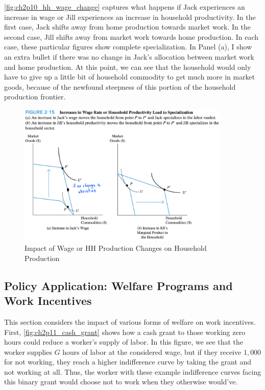 \FloatBarrier

\autoref{fig:ch2p10_hh_wage_change}
captures what happens if Jack experiences an increase 
in wage or Jill experiences an increase in
household productivity.
In the first case, Jack shifts away from home 
production towards market work.
In the second case, Jill shifts away from market work
towards home production. In each case, these particular figures 
show complete specialization. In Panel (a), I show
an extra bullet if there was no change in Jack's 
allocation between market work and home production.
At this point, we can see that the household would only have to 
give up a little bit of household commodity
to get much more in market goods, because of the 
newfound steepness of this portion of the household production frontier.

\begin{figure}[!htb]
    \centering
        \includegraphics[width=0.9\textwidth]{../input/ch_2p10_hh_wage_change.png}
    \caption{Impact of Wage or HH Production Changes on Household Production}
    \label{fig:ch2p10_hh_wage_change}
\end{figure}

\subsection{Policy Application: Welfare Programs and Work Incentives}

This section considers the impact of various forms of welfare on 
work incentives. 
First, \autoref{fig:ch2p11_cash_grant}
shows how a cash grant to those working zero hours 
could reduce a worker's supply of labor. 
In this figure, we see that the worker supplies $G$ 
hours of labor at the considered wage, but if they receive
$1,000$ for not working, they reach a higher indifference curve 
by taking the grant and not working at all. Thus, the
worker with these example indifference curves facing this
binary grant would choose not to work when they otherwise would've.

